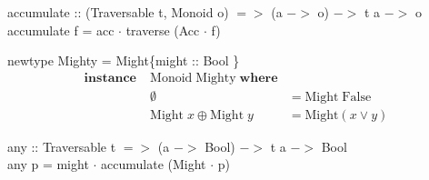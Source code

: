 \documentclass[18pt]{beamer}
\begin{document}
\begin{frame}[fragile] \frametitle{}

accumulate :: (Traversable t, Monoid o) $=>$ (a $->$ o) $->$ t a $->$ o
accumulate f = acc $\cdot$ traverse (Acc $\cdot$ f)

newtype Mighty = Might\{might :: Bool \}
\begin{align*}
\mathbf{instance} \; &\mathrm{Monoid \;  Mighty} \; \mathbf{where}\\
&\emptyset &= \mathrm{Might} \; \mathrm{False}\\
&\mathrm{Might}\; x \oplus \mathrm{Might}\; y &= \mathrm{Might} (x \lor y)
\end{align*}

any :: Traversable t $=>$ (a $->$ Bool) $->$ t a $->$ Bool\\
any p = might $\cdot$ accumulate (Might $\cdot$ p)
\end{frame}
\end{document}
